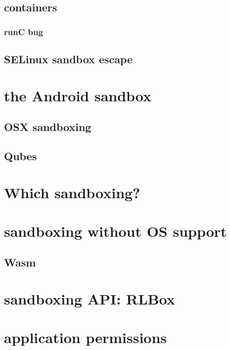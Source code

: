\subsection{containers}



\subsubsection{runC bug}


\subsection{SELinux sandbox escape}

\section{the Android sandbox}



\subsection{OSX sandboxing}

\subsection{Qubes}


\section{Which sandboxing?}


\section{sandboxing without OS support}


\subsection{Wasm}



\section{sandboxing API: RLBox}


\section{application permissions}


